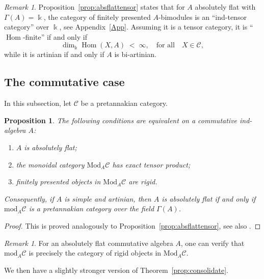 \documentclass[11pt]{amsart}
\def\dim{\operatorname{dim}}
\def\Hom{\operatorname{Hom}}
\def\cC{\mathscr{C}}
\def\bk{\Bbbk}
\def\mod{\mathrm{ mod}}
\def\Mod{\mathrm{Mod}}
\newtheorem{prop}[thm]{Proposition}
\theoremstyle{definition}
\theoremstyle{remark}
\newtheorem{remark}[thm]{Remark}
\numberwithin{equation}{section}
\begin{document}
\begin{remark}

Proposition~\ref{prop:absflattensor} states that for $A$ absolutely flat with $\Gamma(A)=\bk$, the category of finitely presented $A$-bimodules is an ``ind-tensor category'' over $\bk$, see Appendix~\ref{App}. Assuming it is a tensor category, it is ``$\Hom$-finite'' if and only if
    \begin{equation}\label{eq:finHom}
        \dim_{\bk}\Hom(X,A)\;<\;\infty,\quad\mbox{for all}\quad X\in\cC,
    \end{equation}
    while it is artinian if and only if $A$ is bi-artinian.
\end{remark}







\subsection{The commutative case}
In this subsection, let $\cC$ be a pretannakian category.

\begin{prop}\label{prop:absflattensor2}
    The following conditions are equivalent on a commutative ind-algebra $A$:
    \begin{enumerate}
        \item $A$ is absolutely flat;
        \item the monoidal category $\Mod_A{\cC}$ has exact tensor product;
        \item finitely presented objects in $\Mod_A{\cC}$ are rigid.
    \end{enumerate}
    Consequently, if $A$ is simple and artinian, then $A$ is absolutely flat if and only if $\mod_A{\cC}$ is a pretannakian category over the field $\Gamma(A)$.
\end{prop}
\begin{proof}
    This is proved analogously to Proposition~\ref{prop:absflattensor}, see also \cite[Proposition~6.1.2]{CEO}.
\end{proof}

\begin{remark}
    For an absolutely flat commutative algebra $A$, one can verify that $\mod_A{\cC}$ is precisely the category of rigid objects in $\Mod_A{\cC}$.
\end{remark}


We then have a slightly stronger version of Theorem~\ref{prop:consolidate}.
\end{document}
